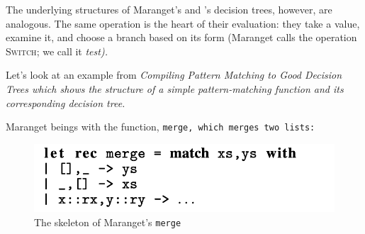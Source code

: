 \documentclass[manuscript,screen,review, 12pt, nonacm]{acmart}
\begin{document}
      
  The underlying structures of Maranget's and \D's decision trees, however,
  are analogous. The same operation is the heart of their evaluation: they
  take a value, examine it, and choose a branch based on its form (Maranget
  calls the operation \textsc{Switch}; we call it \it{test}). 

  Let's look at an example from \it{Compiling Pattern Matching to Good
  Decision Trees} which shows the structure of a simple pattern-matching
  function and its corresponding decision tree.

  Maranget beings with the function, \tt{merge}, which merges two lists: 

  \begin{figure}[H]
      \includegraphics[scale=0.7]{../images/merge.png}
      \caption{The skeleton of Maranget's \tt{merge}}
  \end{figure}




\end{document}
